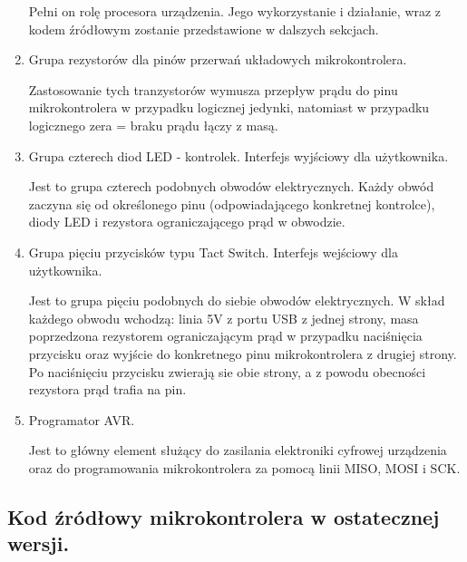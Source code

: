 \documentclass[a4paper,oneside,11pt]{report}
\begin{document}
\begin{enumerate}[1.]
Pełni on rolę procesora urządzenia. Jego wykorzystanie i działanie, wraz z kodem źródłowym zostanie przedstawione w dalszych sekcjach.

\item Grupa rezystorów dla pinów przerwań układowych mikrokontrolera.

Zastosowanie tych tranzystorów wymusza przepływ prądu do pinu mikrokontrolera w przypadku logicznej jedynki, natomiast w przypadku logicznego zera = braku prądu łączy z masą.

\item Grupa czterech diod LED - kontrolek. Interfejs wyjściowy dla użytkownika.

Jest to grupa czterech podobnych obwodów elektrycznych. Każdy obwód zaczyna się od określonego pinu (odpowiadającego konkretnej kontrolce), diody LED i rezystora ograniczającego prąd w obwodzie.

\item Grupa pięciu przycisków typu Tact Switch. Interfejs wejściowy dla użytkownika.

Jest to grupa pięciu podobnych do siebie obwodów elektrycznych. W skład każdego obwodu wchodzą: linia 5V z portu USB z jednej strony, masa poprzedzona rezystorem ograniczającym prąd w przypadku naciśnięcia przycisku oraz wyjście do konkretnego pinu mikrokontrolera z drugiej strony. Po naciśnięciu przycisku zwierają sie obie strony, a z powodu obecności rezystora prąd trafia na pin.

\item Programator AVR.

Jest to główny element służący do zasilania elektroniki cyfrowej urządzenia oraz do programowania mikrokontrolera za pomocą linii MISO, MOSI i SCK.
\end{enumerate}
\subsection{Kod źródłowy mikrokontrolera w ostatecznej wersji.}

\end{document}
